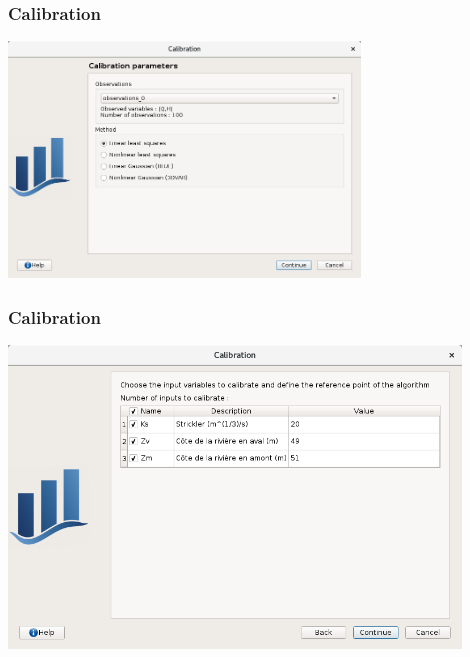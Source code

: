 \documentclass{beamer}
\begin{document}
\begin{frame}
\frametitle{Calibration}
	
\begin{center}
\includegraphics[width=0.7\textwidth]{figures/calibration_algorithms.png}
\end{center}

\end{frame}



\begin{frame}
\frametitle{Calibration}
	
\begin{center}
\includegraphics[width=0.9\textwidth]{figures/calibration-Parametres.png}
\end{center}

\end{frame}

\end{document}
